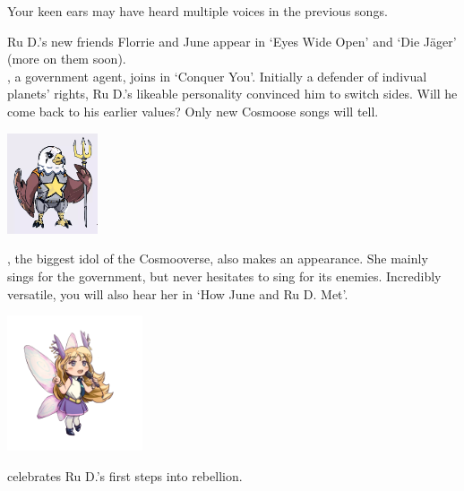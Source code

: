 

Your keen ears may have heard multiple voices in the previous songs.

Ru D.'s new friends Florrie and June appear in `Eyes Wide Open' and `Die Jäger' (more on them soon).\\

, a government agent, joins in `Conquer You'. Initially a defender of indivual planets' rights, Ru D.'s likeable personality convinced him to switch sides. Will he come back to his earlier values? Only new Cosmoose songs will tell.\\

\begin{center}
\includegraphics[width=0.2\textwidth]{Assets/ss_early}
\end{center}

, the biggest idol of the Cosmooverse, also makes an appearance. She mainly sings for the government, but never hesitates to sing for its enemies. Incredibly versatile, you will also hear her in `How June and Ru D. Met'.\\

\begin{center}
\includegraphics[width=0.3\textwidth]{Assets/camo-small}
\end{center}

\clearpage 

 celebrates Ru D.'s first steps into rebellion. 

